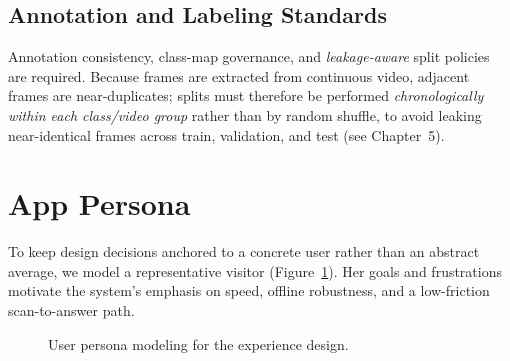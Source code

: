 \subsection{Annotation and Labeling Standards}
Annotation consistency, class-map governance, and \emph{leakage-aware} split policies
are required. Because frames are extracted from continuous video, adjacent frames are
near-duplicates; splits must therefore be performed \emph{chronologically within each
class/video group} rather than by random shuffle, to avoid leaking near-identical
frames across train, validation, and test (see Chapter~5).

\section{App Persona}

To keep design decisions anchored to a concrete user rather than an abstract average,
we model a representative visitor (Figure~\ref{fig:persona}). Her goals and frustrations
motivate the system's emphasis on speed, offline robustness, and a low-friction
scan-to-answer path.

\begin{figure}[htbp]
\centering
{}
\caption{User persona modeling for the \TimeLens{} experience design.}
\label{fig:persona}
\end{figure}


